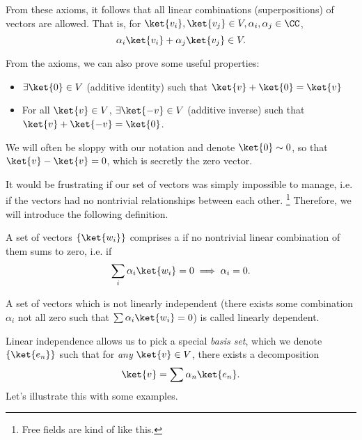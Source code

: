 From these axioms, it follows that all linear combinations (superpositions) of vectors are allowed. That is, for $\ket{v_i},\ket{v_j}\in V, \alpha_i,\alpha_j\in \CC$,
\begin{equation}
    \alpha_i \ket{v_i} +\alpha_j \ket{v_j}\in V.
\end{equation}

From the axioms, we can also prove some useful properties:
\begin{itemize}
    \item $\exists \ket{0}\in V$ (additive identity) such that $\ket{v}+\ket{0}=\ket{v}$
    \item For all $\ket{v}\in V$, $\exists \ket{-v} \in V$ (additive inverse) such that $\ket{v}+\ket{-v}=\ket{0}$.
\end{itemize}
We will often be sloppy with our notation and denote $\ket{0}\sim 0$, so that $\ket{v}-\ket{v}=0$, which is secretly the zero vector.

It would be frustrating if our set of vectors was simply impossible to manage, i.e. if the vectors had no nontrivial relationships between each other.%
    \footnote{Free fields are kind of like this.}
Therefore, we will introduce the following definition.
\begin{defn}
    A set of vectors $\set{\ket{w_i}}$ comprises a  if no nontrivial linear combination of them sums to zero, i.e. if
    \begin{equation}
        \sum_i \alpha_i \ket{w_i} =0 \implies \alpha_i = 0.
    \end{equation}
\end{defn}
\begin{defn}
    A set of vectors which is not linearly independent (there exists some combination $\alpha_i$ not all zero such that $\sum \alpha_i \ket{w_i}=0$) is called linearly dependent.
\end{defn}

Linear independence allows us to pick a special \emph{basis set}, which we denote $\set{\ket{e_n}}$ such that for \emph{any} $\ket{v}\in V$, there exists a decomposition
\begin{equation}
    \ket{v} =\sum \alpha_n \ket{e_n}.
\end{equation}
Let's illustrate this with some examples.

